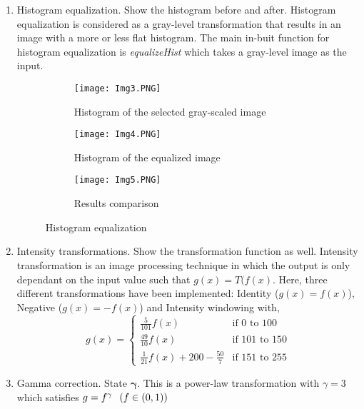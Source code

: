 \documentclass[11pt]{scrartcl}
\begin{document}
{\begin{enumerate}[label=(\alph*)]
\item Histogram equalization. Show the histogram before and after. \newline
Histogram equalization is considered as a gray-level transformation that results in an image with a more or less flat histogram. The main in-buit function for histogram equalization is \textit{equalizeHist} which takes a gray-level image as the input.
\begin{figure}
\centering
\begin{subfigure}{.5\textwidth}
  \centering
  \texttt{[image: Img3.PNG]}
  \caption{Histogram of the selected gray-scaled image}
  \label{fig:sub1}
\end{subfigure}%
\begin{subfigure}{0.5\textwidth}
  \centering
  \texttt{[image: Img4.PNG]}
  \caption{Histogram of the equalized image}
  \label{fig:sub2}
\end{subfigure}
\begin{subfigure}{0.6\textwidth}
  \centering
  \texttt{[image: Img5.PNG]}
  \caption{Results comparison}
  \label{fig:sub2}
\end{subfigure}
\caption{Histogram equalization}
\label{fig:test}
\end{figure}
\item Intensity transformations. Show the transformation function as well. \newline
Intensity transformation is an image processing technique in which the output is only dependant on the input value such that $g(x)=T(f(x)$. Here, three different transformations have been implemented: Identity ($g(x)=f(x)$), Negative ($g(x)=-f(x)$) and Intensity windowing with,
\begin{equation}
    g(x) = 
    \begin{cases}
    \frac{5}{101}f(x) & \text{if 0 to 100}\\
    \frac{49}{10}f(x) & \text{if 101 to 150}\\
    \frac{1}{21}f(x)+200-\frac{50}{7} & \text{if 151 to 255}
    \end{cases}
\end{equation}
\item Gamma correction. State ${\mathbf{\gamma}}$.\newline
This is a power-law transformation with $\gamma=3 $ which satisfies $g = f^\gamma \hspace{0.25cm}(f \in (0,1))$


\end{enumerate}}
\end{document}

